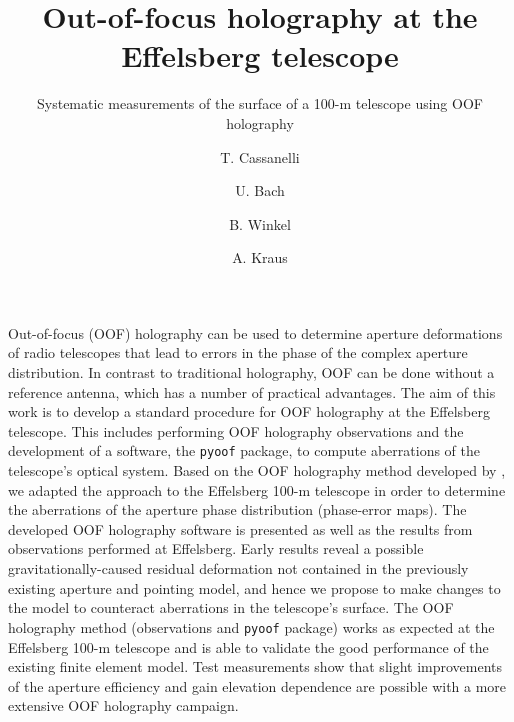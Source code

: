 \documentclass[
    ]
    {aa}
\begin{document}
    \title{Out-of-focus holography at the Effelsberg telescope}
    \subtitle{
        Systematic measurements of the surface of a 100-m telescope using OOF holography
        }

    \author{
        T. Cassanelli\inst{\ref{inst1}}\inst{\ref{inst2}}\inst{\ref{inst3}}
        \and U. Bach\inst{\ref{inst1}}
        \and B. Winkel\inst{\ref{inst1}}
        \and A. Kraus\inst{\ref{inst1}}
    }


    \abstract
    {Out-of-focus (OOF) holography can be used to determine aperture deformations of radio telescopes that lead to errors in the phase of the complex aperture distribution. In contrast to traditional holography, OOF can be done without a reference antenna, which has a number of practical advantages.}
    {The aim of this work is to develop a standard procedure for OOF holography at the Effelsberg telescope. This includes performing OOF holography observations and the development of a software, the \texttt{pyoof} package, to compute aberrations of the telescope's optical system.}
    {Based on the OOF holography method developed by \citet{2007A&A...465..679N}, we adapted the approach to the Effelsberg 100-m telescope in order to determine the aberrations of the aperture phase distribution (phase-error maps).}
    {The developed OOF holography software is presented as well as the results from observations performed at Effelsberg. Early results reveal a possible gravitationally-caused residual deformation not contained in the previously existing aperture and pointing model, and hence we propose to make changes to the model to counteract aberrations in the telescope's surface.}
    {The OOF holography method (observations and \texttt{pyoof} package) works as expected at the Effelsberg 100-m telescope and is able to validate the good performance of the existing finite element model. Test measurements show that slight improvements of the aperture efficiency and gain elevation dependence are possible with a more extensive OOF holography campaign.}
\end{document}
